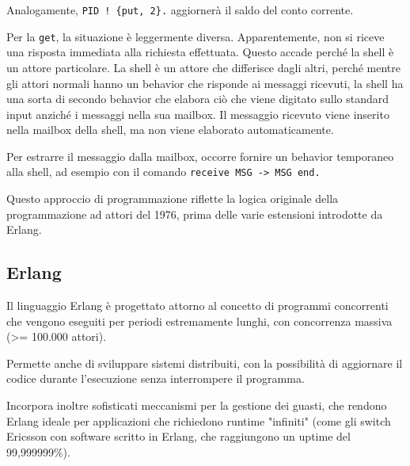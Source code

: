 \documentclass{article}
\begin{document}
Analogamente, \texttt{PID ! \{put, 2\}.} aggiornerà il saldo del conto corrente.

Per la \texttt{get}, la situazione è leggermente diversa. Apparentemente, non si riceve una risposta immediata alla richiesta effettuata. Questo accade perché la shell è un attore particolare. La shell è un attore che differisce dagli altri, perché mentre gli attori normali hanno un behavior che risponde ai messaggi ricevuti, la shell ha una sorta di secondo behavior che elabora ciò che viene digitato sullo standard input anziché i messaggi nella sua mailbox. Il messaggio ricevuto viene inserito nella mailbox della shell, ma non viene elaborato automaticamente.

Per estrarre il messaggio dalla mailbox, occorre fornire un behavior temporaneo alla shell, ad esempio con il comando \texttt{receive MSG -> MSG end.}

Questo approccio di programmazione riflette la logica originale della programmazione ad attori del 1976, prima delle varie estensioni introdotte da Erlang.

\subsection*{Erlang}
Il linguaggio Erlang è progettato attorno al concetto di programmi concorrenti che vengono eseguiti per periodi estremamente lunghi, con concorrenza massiva (>= 100.000 attori).

Permette anche di sviluppare sistemi distribuiti, con la possibilità di aggiornare il codice durante l'esecuzione senza interrompere il programma.

Incorpora inoltre sofisticati meccanismi per la gestione dei guasti, che rendono Erlang ideale per applicazioni che richiedono runtime "infiniti" (come gli switch Ericsson con software scritto in Erlang, che raggiungono un uptime del 99,999999\%).

\pagebreak
\end{document}
